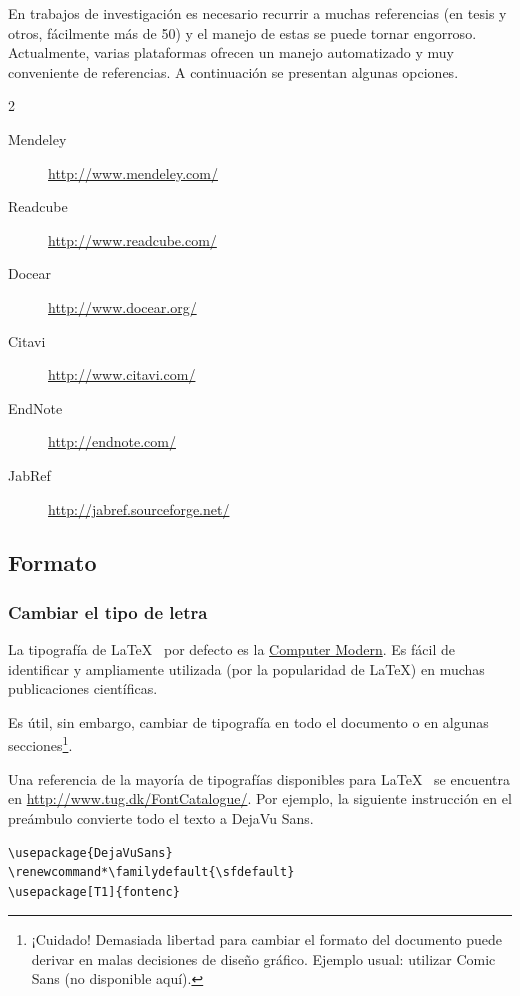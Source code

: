 \documentclass[12pt,letterpaper]{article}
\begin{document}
En trabajos de investigación es necesario recurrir a muchas referencias (en tesis y otros, fácilmente más de 50) y el manejo de estas se puede tornar engorroso. Actualmente, varias plataformas ofrecen un manejo automatizado y muy conveniente de referencias. A continuación se presentan algunas opciones.

\begin{multicols}{2}
\begin{description}
\item[Mendeley] \url{http://www.mendeley.com/}
\item[Readcube] \url{http://www.readcube.com/}
\item[Docear] \url{http://www.docear.org/}
\item[Citavi] \url{http://www.citavi.com/}
\item[EndNote] \url{http://endnote.com/}
\item[JabRef] \url{http://jabref.sourceforge.net/}
\end{description}
\end{multicols}

\subsection{Formato}

\subsubsection{Cambiar el tipo de letra}

La tipografía de \LaTeX~ por defecto es la \href{https://en.wikipedia.org/wiki/Computer_Modern}{Computer Modern}. Es fácil de identificar y ampliamente utilizada (por la popularidad de \LaTeX) en muchas publicaciones científicas.

Es útil, sin embargo, cambiar de tipografía en todo el documento o en algunas secciones\footnote{¡Cuidado! Demasiada libertad para cambiar el formato del documento puede derivar en malas decisiones de diseño gráfico. Ejemplo usual: utilizar Comic Sans (no disponible aquí).}.

Una referencia de la mayoría de tipografías disponibles para \LaTeX~ se encuentra en \url{http://www.tug.dk/FontCatalogue/}. Por ejemplo, la siguiente instrucción en el preámbulo convierte todo el texto a DejaVu Sans.

\begin{verbatim}
\usepackage{DejaVuSans}
\renewcommand*\familydefault{\sfdefault} 
\usepackage[T1]{fontenc}
\end{verbatim}
\end{document}
